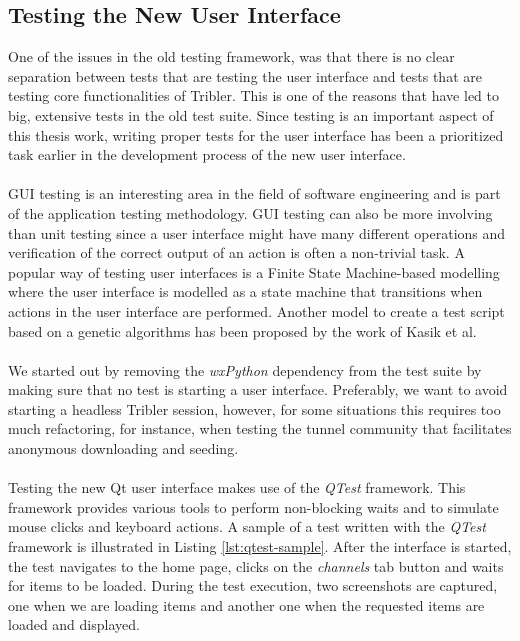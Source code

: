 \subsection{Testing the New User Interface}
One of the issues in the old testing framework, was that there is no clear separation between tests that are testing the user interface and tests that are testing core functionalities of Tribler. This is one of the reasons that have led to big, extensive tests in the old test suite. Since testing is an important aspect of this thesis work, writing proper tests for the user interface has been a prioritized task earlier in the development process of the new user interface.\\\\
GUI testing is an interesting area in the field of software engineering and is part of the application testing methodology. GUI testing can also be more involving than unit testing since a user interface might have many different operations and verification of the correct output of an action is often a non-trivial task. A popular way of testing user interfaces is a Finite State Machine-based modelling where the user interface is modelled as a state machine that transitions when actions in the user interface are performed\cite{clarke1998automated}\cite{belli2001finite}. Another model to create a test script based on a genetic algorithms has been proposed by the work of Kasik et al\cite{kasik1996toward}.\\\\
We started out by removing the \emph{wxPython} dependency from the test suite by making sure that no test is starting a user interface. Preferably, we want to avoid starting a headless Tribler session, however, for some situations this requires too much refactoring, for instance, when testing the tunnel community that facilitates anonymous downloading and seeding.\\\\
Testing the new Qt user interface makes use of the \emph{QTest} framework. This framework provides various tools to perform non-blocking waits and to  simulate mouse clicks and keyboard actions. A sample of a test written with the \emph{QTest} framework is illustrated in Listing \ref{lst:qtest-sample}. After the interface is started, the test navigates to the home page, clicks on the \emph{channels} tab button and waits for items to be loaded. During the test execution, two screenshots are captured, one when we are loading items and another one when the requested items are loaded and displayed.\\\\
